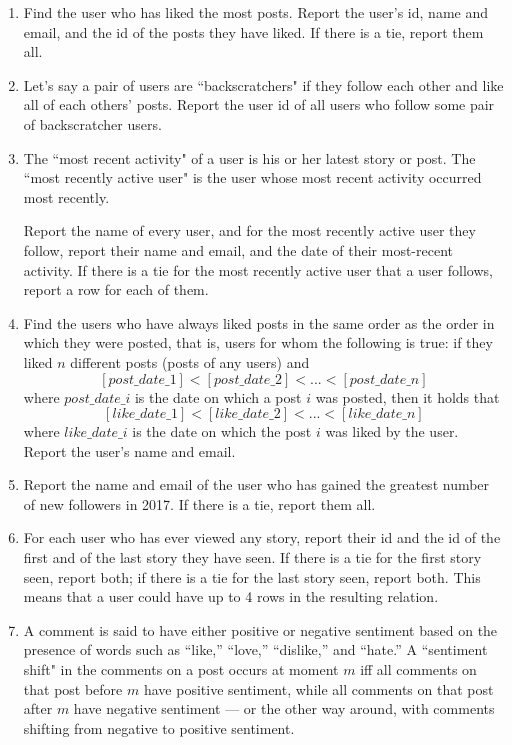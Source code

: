 \documentclass{article}
\begin{document}
\begin{enumerate}
\item   %
Find the user who has liked the most posts. 
Report the user's id, name and email, and the id of the posts they have liked. 
If there is a tie, report them all.

\item   %
Let's say a pair of users are ``backscratchers" 
if they follow each other and like all of each others' posts. 
Report the user id of all users who follow some pair of backscratcher users.

\item   %
The ``most recent activity" of a user is his or her latest story or post. 
The ``most recently active user" is the user whose most recent activity
occurred most recently.

Report the name of every user,
and for the most recently active user they follow,
report their name and email, and the date of their most-recent activity.
If there is a tie for the most recently active user that a user follows,
report a row for each of them.

\item   %
Find the users who have always liked posts
in the same order as the order in which they were posted,
that is,
users for whom the following is true:
if they liked $n$ different posts (posts of any users)
and
$$[post\_date\_1] < [post\_date\_2] < ... < [post\_date\_n]$$
where $post\_date\_i$ is the date on which a post $i$ was posted, 
then it holds that
$$[like\_date\_1] < [like\_date\_2] < ... < [like\_date\_n]$$ 
where $like\_date\_i$ is the date on which the post $i$ was liked 
by the user.  
Report the user's name and email.

\item   %
Report the name and email of the user
who has gained the greatest number of new followers in 2017. 
If there is a tie, report them all.

\item   %
For each user who has ever viewed any story, 
	report their id and the id of the first and of the last story they have seen.
If there is a tie for the first story seen, report both;
if there is a tie for the last story seen, report both.
This means that a user could have up to 4 rows in the resulting relation.

\item   %
A comment is said to have either positive or negative sentiment
based on the presence of words such as ``like,'' ``love,'' ``dislike,'' and ``hate.'' 
A ``sentiment shift" in the comments on a post occurs at moment $m$ iff
all comments on that post before $m$ have positive sentiment, 
while all comments on that post after $m$ have negative sentiment ---
or the other way around, with comments shifting from negative to positive sentiment.


\end{enumerate}
\end{document}
